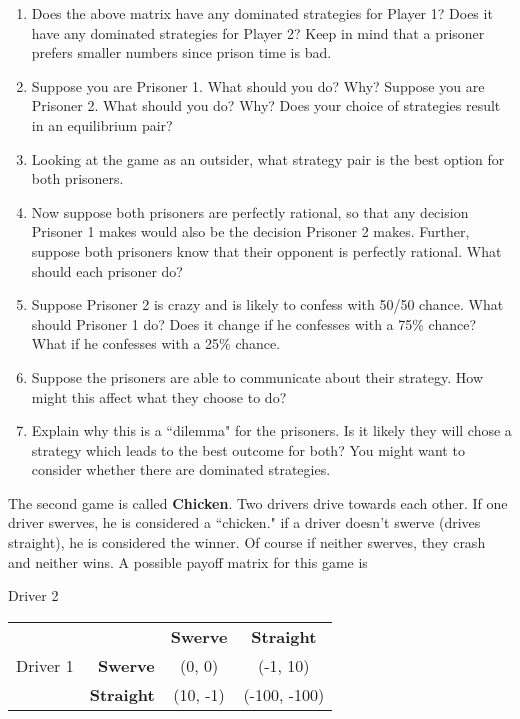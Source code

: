 \begin{enumerate}
\item Does the above matrix have any dominated strategies for Player 1? Does it have any dominated strategies for Player 2? Keep in mind that a prisoner prefers smaller numbers since prison time is bad.

\item Suppose you are Prisoner 1. What should you do? Why? Suppose you are Prisoner 2. What should you do? Why? Does your choice of strategies result in an equilibrium pair?

\item Looking at the game as an outsider, what strategy pair is the best option for both prisoners. 

\item Now suppose both prisoners are perfectly rational, so that any decision Prisoner 1 makes would also be the decision Prisoner 2 makes. Further, suppose both prisoners know that their opponent is perfectly rational. What should each prisoner do?

\item Suppose Prisoner 2 is crazy and is likely to confess with 50/50 chance. What should Prisoner 1 do? Does it change if he confesses with a 75\% chance? What if he confesses with a 25\% chance.

\item Suppose the prisoners are able to communicate about their strategy. How might this affect what they choose to do?

\item Explain why this is a ``dilemma" for the prisoners. Is it likely they will chose a strategy which leads to the best outcome for both? You might want to consider whether there are dominated strategies.

\end{enumerate}

\break
The second game is called {\bf Chicken}. Two drivers drive towards each other. If one driver swerves, he is considered a ``chicken." if a driver doesn't swerve (drives straight), he is considered the winner. Of course if neither swerves, they crash and neither wins. A possible payoff matrix for this game is

\hspace{3in}Driver 2

\begin{center}
\begin{tabular}{l|r|c|c|}\cline{2-4}
&&\textbf{Swerve}&\textbf{Straight}\\ \cline{2-4}
Driver 1&\textbf{Swerve} &(0, 0)&(-1, 10)\\ \cline{2-4}
&\textbf{Straight} &(10, -1)&(-100, -100)\\ \cline{2-4}
\end{tabular}
\end{center}
\vspace{.1in}

